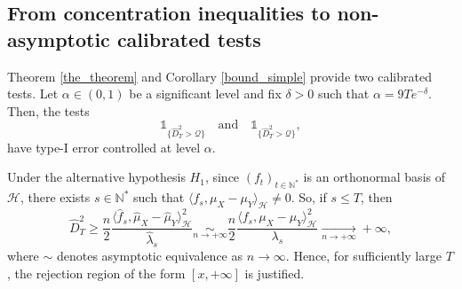 \documentclass[twoside,11pt]{article}
\newcommand{\Hk}{\mathcal{H}}
\newcommand{\ind}[1]{\mathds{1}_{#1}}%
\newcommand{\N}{\mathbb{N}}%
\newcommand{\qmaj}{\mathcal{Q}}
\newcommand{\qmajbis}{\mathscr{Q}}
\begin{document}
\subsection{From concentration inequalities to non-asymptotic calibrated tests}
Theorem \ref{the_theorem} and Corollary \ref{bound_simple} provide two calibrated tests. Let $\alpha \in (0,1)$ be a significant level  and fix $\delta > 0$ such that $\alpha = 9T e^{-\delta}$. Then, the tests
\begin{equation}
		\ind{\big\{\widehat{D}^2_T > \qmaj \big\}}
		\quad \text{and} \quad
		\ind{\big\{\widehat{D}^2_T > \qmajbis \big\}},
		\label{les_deux_tests}
	\end{equation}
have type-I error controlled at level $\alpha$. 
\begin{remark}
Under the alternative hypothesis $H_1$, since $\left(f_t\right)_{t \in \N^{*}}$ is an orthonormal basis of $\Hk$, there exists $s \in \N^{*}$ such that $\langle f_s, \mu_X - \mu_Y \rangle_{\Hk} \neq 0$. So, if $s \leq T$, then 
$$
\widehat{D}^2_T \geq \frac{n}{2} \frac{\langle \widehat{f}_s, \widehat{\mu}_X - \widehat{\mu}_Y \rangle_{\Hk}^2}{\widehat{\lambda}_s} \underset{n \rightarrow + \infty}{\sim} \frac{n}{2} \frac{\langle f_s, \mu_X - \mu_Y \rangle_{\Hk}^2}{\lambda_s}  \underset{n \rightarrow + \infty}{\longrightarrow} + \infty,
$$
where $\sim$ denotes asymptotic equivalence as $n \to \infty.$ Hence, for sufficiently large $T$, the rejection region of the form $[x, + \infty]$ is justified. 
\end{remark}

\end{document}
